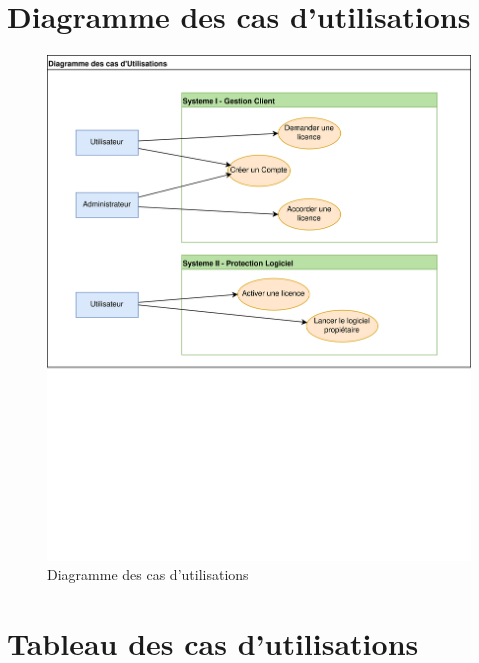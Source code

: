 \newpage

\section{Diagramme des cas d'utilisations}

\begin{figure}[h!]
	\centering
	\includegraphics[width=16cm]{main/png/Util.png}
    \vspace{-7cm}
	\caption{Diagramme des cas d'utilisations}
	\label{fig:fig2}
\end{figure}

\section{Tableau des cas d'utilisations}

